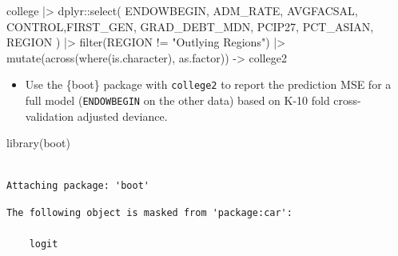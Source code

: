 \documentclass[
  letterpaper,
  DIV=11,
  numbers=noendperiod]{scrartcl}
\newenvironment{Shaded}{\begin{snugshade}}{\end{snugshade}}
\newcommand{\AttributeTok}[1]{\textcolor[rgb]{0.40,0.45,0.13}{#1}}
\newcommand{\DecValTok}[1]{\textcolor[rgb]{0.68,0.00,0.00}{#1}}
\newcommand{\FunctionTok}[1]{\textcolor[rgb]{0.28,0.35,0.67}{#1}}
\newcommand{\NormalTok}[1]{\textcolor[rgb]{0.00,0.23,0.31}{#1}}
\newcommand{\OtherTok}[1]{\textcolor[rgb]{0.00,0.23,0.31}{#1}}
\newcommand{\SpecialCharTok}[1]{\textcolor[rgb]{0.37,0.37,0.37}{#1}}
\newcommand{\StringTok}[1]{\textcolor[rgb]{0.13,0.47,0.30}{#1}}
\providecommand{\tightlist}{%
  \setlength{\itemsep}{0pt}\setlength{\parskip}{0pt}}\usepackage{longtable,booktabs,array}
\begin{document}
\begin{Shaded}
\begin{Highlighting}[]
\NormalTok{college }\SpecialCharTok{|\textgreater{}}
\NormalTok{  dplyr}\SpecialCharTok{::}\FunctionTok{select}\NormalTok{(}
\NormalTok{     ENDOWBEGIN, ADM\_RATE, AVGFACSAL, CONTROL,FIRST\_GEN, GRAD\_DEBT\_MDN, PCIP27, }
\NormalTok{PCT\_ASIAN, REGION}
\NormalTok{  ) }\SpecialCharTok{|\textgreater{}}
  \FunctionTok{filter}\NormalTok{(REGION }\SpecialCharTok{!=} \StringTok{"Outlying Regions"}\NormalTok{) }\SpecialCharTok{|\textgreater{}}
  \FunctionTok{mutate}\NormalTok{(}\FunctionTok{across}\NormalTok{(}\FunctionTok{where}\NormalTok{(is.character), as.factor)) }\OtherTok{{-}\textgreater{}}
\NormalTok{college2}
\end{Highlighting}
\end{Shaded}

\begin{itemize}
\tightlist
\item
  Use the \{boot\} package with \texttt{college2} to report the
  prediction MSE for a full model (\texttt{ENDOWBEGIN} on the other
  data) based on K-10 fold cross-validation adjusted deviance.
\end{itemize}

\begin{Shaded}
\begin{Highlighting}[]
\FunctionTok{library}\NormalTok{(boot)}
\end{Highlighting}
\end{Shaded}

\begin{verbatim}

Attaching package: 'boot'
\end{verbatim}

\begin{verbatim}
The following object is masked from 'package:car':

    logit
\end{verbatim}

\begin{Shaded}
\end{Shaded}
\end{document}
